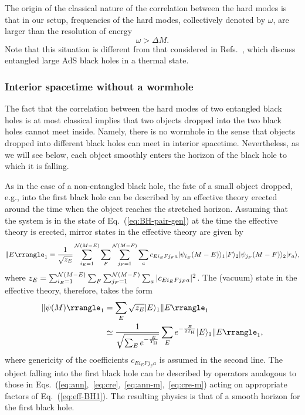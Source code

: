 \documentclass[12pt]{article}
\begin{document}
The origin of the classical nature of the correlation between 
the hard modes is that in our setup, frequencies of the hard modes, 
collectively denoted by $\omega$, are larger than the resolution 
of energy
%
\begin{equation}
  \omega > \varDelta M.
\label{eq:reason}
\end{equation}
%
Note that this situation is different from that considered in 
Refs.~\cite{Maldacena:2001kr,Gao:2016bin}, which discuss entangled 
large AdS black holes in a thermal state.

\subsubsection{Interior spacetime without a wormhole}
\label{subsubsec:pair-int}

The fact that the correlation between the hard modes of two entangled 
black holes is at most classical implies that two objects dropped 
into the two black holes cannot meet inside.  Namely, there is no 
wormhole in the sense that objects dropped into different black 
holes can meet in interior spacetime.  Nevertheless, as we will 
see below, each object smoothly enters the horizon of the black 
hole to which it is falling.

As in the case of a non-entangled black hole, the fate of a small 
object dropped, e.g., into the first black hole can be described 
by an effective theory erected around the time when the object 
reaches the stretched horizon.  Assuming that the system is in 
the state of Eq.~(\ref{eq:BH-pair-gen}) at the time the effective 
theory is erected, mirror states in the effective theory are 
given by
%
\begin{equation}
  \ketc{E}_1 = \frac{1}{\sqrt{z_E}} \sum_{i_E = 1}^{{\cal N}(M-E)} 
    \sum_F \sum_{j_F = 1}^{{\cal N}(M-F)} \sum_a 
    c_{E i_E F j_F a} \ket{\psi_{i_E}(M-E)}_1 
    \ket{F}_2 \ket{\psi_{j_F}(M-F)}_2 \ket{r_a},
\label{eq:mirror-BH1}
\end{equation}
%
where $z_E = \sum_{i_E = 1}^{{\cal N}(M-E)} \sum_F 
\sum_{j_F = 1}^{{\cal N}(M-F)} \sum_a |c_{E i_E F j_F a}|^2$. 
The (vacuum) state in the effective theory, therefore, takes 
the form
%
\begin{align}
  \ketc{\psi(M)}_1 &= \sum_E \sqrt{z_E} \ket{E}_1 \ketc{E}_1 
\nonumber\\
  &\simeq \frac{1}{\sqrt{\sum_E e^{-\frac{E}{T_{\rm H}}}}} 
    \sum_E e^{-\frac{E}{2 T_{\rm H}}} \ket{E}_1 \ketc{E}_1,
\label{eq:eff-BH1}
\end{align}
%
where genericity of the coefficients $c_{E i_E F j_F a}$ is 
assumed in the second line.  The object falling into the first 
black hole can be described by operators analogous to those in 
Eqs.~(\ref{eq:ann},~\ref{eq:cre},~\ref{eq:ann-m},~\ref{eq:cre-m}) 
acting on appropriate factors of Eq.~(\ref{eq:eff-BH1}). The 
resulting physics is that of a smooth horizon for the first 
black hole.
\end{document}
